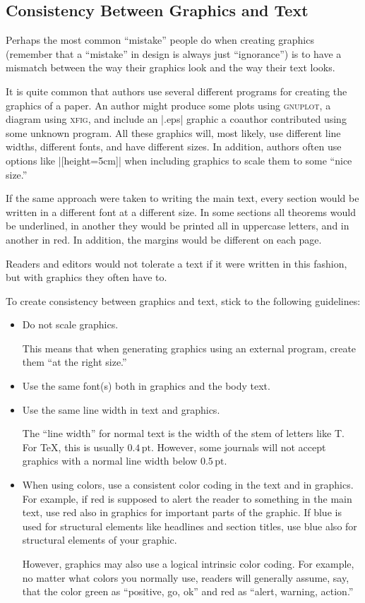 \subsection{Consistency Between Graphics and Text}

Perhaps the most common ``mistake'' people do when creating graphics
(remember that a ``mistake'' in design is always just ``ignorance'')
is to have a mismatch between the way their graphics look and the way 
their text looks.

It is quite common that authors use several different programs for
creating the graphics of a paper. An author might produce some plots
using \textsc{gnuplot}, a diagram using \textsc{xfig}, and include an
|.eps| graphic a coauthor contributed using some unknown program. All
these graphics will, most likely, use different line widths, different
fonts, and have different sizes. In addition, authors often use
options like |[height=5cm]| when including graphics to scale them to
some ``nice size.''

If the same approach were taken to writing the main text, every
section would be written in a different font at a different size. In
some sections all theorems would be underlined, in another they would
be printed all in uppercase letters, and in another in red. In
addition, the margins would be different on each page.

Readers and editors would not tolerate a text if it were written in
this fashion, but with graphics they often have to.

To create consistency between graphics and text, stick to the
following guidelines:
\begin{itemize}
\item
  Do not scale graphics.

  This means that when generating graphics using an external program,
  create them ``at the right size.''
\item
  Use the same font(s) both in graphics and the body text.
\item
  Use the same line width in text and graphics.

  The  ``line width'' for normal text is the width of the stem of
  letters like T{}. For \TeX, this is usually
  $0.4\,\mathrm{pt}$. However, some journals will not accept graphics
  with a normal line width below $0.5\,\mathrm{pt}$.
\item
  When using colors, use a consistent color coding in the text and in  
  graphics. For example, if red is supposed to alert the reader to
  something in the main text, use red also in graphics for important
  parts of the graphic. If blue is used for structural elements like 
  headlines and section titles, use blue also for structural elements
  of your graphic.

  However, graphics may also use a logical intrinsic color
  coding. For example, no matter what colors you normally use, readers
  will generally assume, say, that the color green as ``positive, go,
  ok'' and red as ``alert, warning, action.''
\end{itemize}

